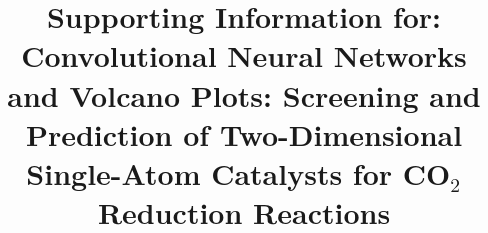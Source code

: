 

\title{Supporting Information for:  \\
Convolutional Neural Networks and Volcano Plots:
Screening and Prediction of Two-Dimensional Single-Atom Catalysts for CO$_2$ Reduction Reactions}


\author{}  %


\maketitle
